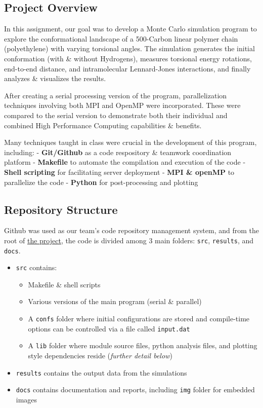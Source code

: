 \documentclass[
]{article}
\providecommand{\tightlist}{%
  \setlength{\itemsep}{0pt}\setlength{\parskip}{0pt}}
\begin{document}
\subsection{Project Overview}\label{project-overview}

In this assignment, our goal was to develop a Monte Carlo simulation
program to explore the conformational landscape of a 500-Carbon linear
polymer chain (polyethylene) with varying torsional angles. The
simulation generates the initial conformation (with \& without
Hydrogens), measures torsional energy rotations, end-to-end distance,
and intramolecular Lennard-Jones interactions, and finally analyzes \&
visualizes the results.

After creating a serial processing version of the program,
parallelization techniques involving both MPI and OpenMP were
incorporated. These were compared to the serial version to demonstrate
both their individual and combined High Performance Computing
capabilities \& benefits.

Many techniques taught in class were crucial in the development of this
program, including: - \textbf{Git/Github} as a code respository \&
teamwork coordination platform - \textbf{Makefile} to automate the
compilation and execution of the code - \textbf{Shell scripting} for
facilitating server deployment - \textbf{MPI \& openMP} to parallelize
the code - \textbf{Python} for post-processing and plotting

\subsection{Repository Structure}\label{repository-structure}

Github was used as our team's code repository management system, and
from the root of
\href{https://github.com/Eines-Informatiques-Avancades/Project_2026_II}{the
project}, the code is divided among 3 main folders: \texttt{src},
\texttt{results}, and \texttt{docs}.

\begin{itemize}
\tightlist
\item
  \texttt{src} contains:

  \begin{itemize}
  \tightlist
  \item
    Makefile \& shell scripts
  \item
    Various versions of the main program (serial \& parallel)
  \item
    A \texttt{confs} folder where initial configurations are stored and
    compile-time options can be controlled via a file called
    \texttt{input.dat}
  \item
    A \texttt{lib} folder where module source files, python analysis
    files, and plotting style dependencies reside (\emph{further detail
    below})
  \end{itemize}
\item
  \texttt{results} contains the output data from the simulations
\item
  \texttt{docs} contains documentation and reports, including
  \texttt{img} folder for embedded images
\end{itemize}
\end{document}
